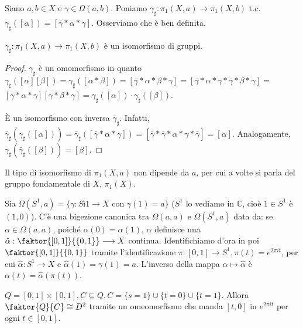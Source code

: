 Siano $a, b \in X$ e $\gamma \in \Omega(a, b)$. Poniamo $\gamma_{\sharp}: \pi_1(X, a) \longrightarrow \pi_1(X, b)$ t.c. $\gamma_{\sharp}([\alpha])=[\bar{\gamma} * \alpha * \gamma]$. Osserviamo che è ben definita.

\begin{thm}
  $\gamma_{\sharp}: \pi_1(X, a) \longrightarrow \pi_1(X, b)$ è un isomorfismo di gruppi.
  \begin{proof}
    $\gamma_{\sharp}$ è un omomorfismo in quanto $\gamma_{\sharp}([\alpha][\beta])=\gamma_{\sharp}([\alpha * \beta])=[\bar{\gamma} * \alpha * \beta * \gamma]=[\bar{\gamma} * \alpha * \gamma * \bar{\gamma} * \beta * \gamma]=$
    $[\bar{\gamma} * \alpha * \gamma][\bar{\gamma} * \beta * \gamma]=\gamma_{\sharp}([\alpha]) \cdot \gamma_{\sharp}([\beta])$.

    È un isomorfismo con inversa $\bar{\gamma}_{\sharp}$. Infatti,
    $\bar{\gamma}_{\sharp}(\gamma_{\sharp}([\alpha]))=\bar{\gamma}_{\sharp}([\bar{\gamma} * \alpha * \gamma])=[\bar{\bar{\gamma}} * \bar{\gamma} * \alpha * \gamma * \bar{\gamma}]=[\alpha]$.
    Analogamente, $\gamma_{\sharp}(\bar{\gamma}_{\sharp}([\beta]))=[\beta]$.
  \end{proof}
\end{thm}

\begin{cor}
  Il tipo di isomorfismo di $\pi_1(X, a)$ non dipende da $a$, per cui a volte si parla del gruppo fondamentale di $X$, $\pi_1(X)$.
\end{cor}

\begin{defn}
  Sia $\Omega(S^1, a)=\{ \gamma: Sì1 \longrightarrow X \text{ con } \gamma(1)=a\}$ ($S^1$ lo vediamo in $\mathbb{C}$, cioè $1 \in S^1$ è $(1, 0)$). C'è una bigezione canonica tra $\Omega(a, a)$ e $\Omega(S^1, a)$ data da: se $\alpha \in \Omega(a, a)$, poiché
  $\alpha(0)=\alpha(1)$, $\alpha$ definisce una $\hat{\alpha}: \faktor{[0, 1]}{\{0, 1\}} \longrightarrow X$ continua. Identifichiamo d'ora in poi $\faktor{[0, 1]}{\{0, 1\}}$ tramite l'identificazione $\pi: [0, 1] \longrightarrow S^1, \pi(t)=e^{2 \pi i t}$, per cui
  $\hat{\alpha}:S^1 \longrightarrow X$ e $\hat{\alpha}(1)=\gamma(1)=a$. L'inverso della mappa $\alpha \longmapsto \hat{\alpha}$ è $\alpha(t)=\hat{\alpha}(\pi(t))$.
\end{defn}

\begin{lm} \label{Q/C=D^2}
  $Q=[0, 1] \times [0, 1], C \subseteq Q, C=\{s=1\} \cup \{t=0\} \cup \{t=1\}$. Allora $\faktor{Q}{C} \cong D^2$ tramite un omeomorfismo che manda $[t, 0]$ in $e^{2 \pi i t}$ per ogni $t \in [0, 1]$.
\end{lm}

